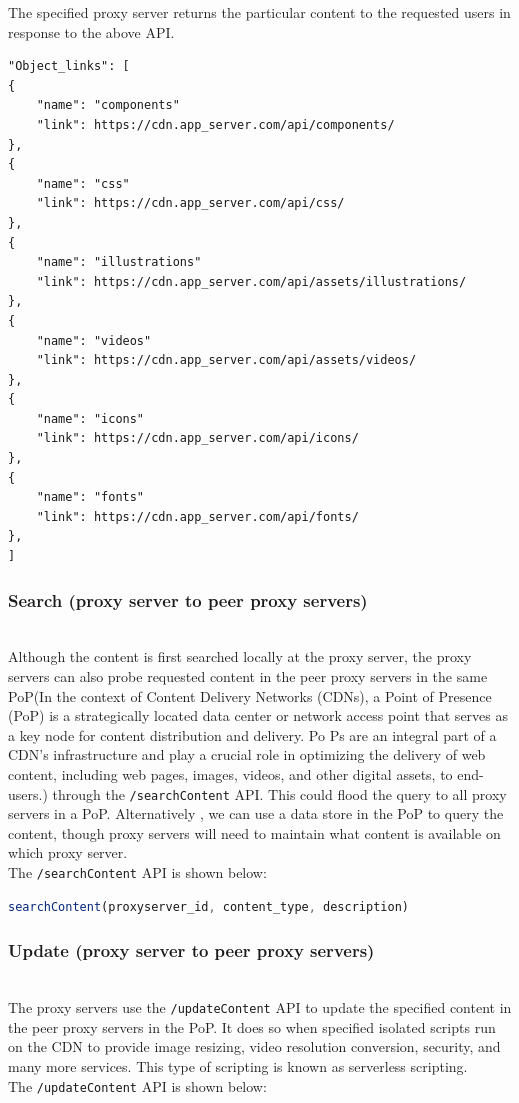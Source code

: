 \hfill\break
The specified proxy server returns the particular content to the requested users in response to the above API.

\begin{verbatim}
"Object_links": [
{
	"name": "components"
	"link": https://cdn.app_server.com/api/components/
},
{
	"name": "css"
	"link": https://cdn.app_server.com/api/css/
},
{
	"name": "illustrations"
	"link": https://cdn.app_server.com/api/assets/illustrations/
},
{
	"name": "videos"
	"link": https://cdn.app_server.com/api/assets/videos/
},
{
	"name": "icons"
	"link": https://cdn.app_server.com/api/icons/
},
{
	"name": "fonts"
	"link": https://cdn.app_server.com/api/fonts/
},
]
\end{verbatim}

\subsubsection{Search (proxy server to peer proxy servers)}\label{6HJxs45LVbGqft6o4Hs8M}
\\
Although the content is first searched locally at the proxy server, the proxy servers can also probe requested content in the peer proxy servers in the same PoP(In the context of Content Delivery Networks (CDNs), a Point of Presence (PoP) is a strategically located data center or network access point that serves as a key node for content distribution and delivery. Po Ps are an integral part of a CDN's infrastructure and play a crucial role in optimizing the delivery of web content, including web pages, images, videos, and other digital assets, to end-users.) through the \texttt{/searchContent} API. This could flood the query to all proxy servers in a PoP. Alternatively
, we can use a data store in the PoP to query the content, though proxy servers will need to maintain what content is available on which proxy server.
\\
The \texttt{/searchContent} API is shown below:

\begin{lstlisting}[language=JavaScript]
searchContent(proxyserver_id, content_type, description)
\end{lstlisting}

\subsubsection{Update (proxy server to peer proxy servers)}\label{9Kzdowj3EQVrkoGSDuK_1}
\\
The proxy servers use the \texttt{/updateContent} API to update the specified content in the peer proxy servers in the PoP. It does so when specified isolated scripts run on the CDN to provide image resizing, video resolution conversion, security, and many more services. This type of scripting is known as serverless scripting.
\\
The \texttt{/updateContent} API is shown below:

